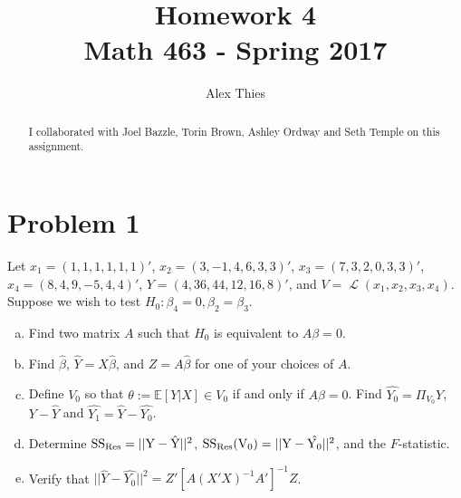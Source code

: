 \documentclass{amsart}\usepackage[]{graphicx}\usepackage[]{color}
\author{Alex Thies}
\title{Homework 4 \\ Math 463 - Spring 2017}
\DeclareMathOperator{\Ell}{\mathscr{L}}
\begin{document}
	\begin{abstract}
		I collaborated with Joel Bazzle, Torin Brown, Ashley Ordway and Seth Temple on this assignment.
	\end{abstract}

	\maketitle


	\section*{Problem 1} %
	\label{sec:problem_1}
		Let $x_{1} =(1,1,1,1,1,1)'$, $x_{2} = (3,−1,4,6,3,3)'$, $x_{3} = (7,3,2,0,3,3)'$, $x_{4} = (8,4,9,−5,4,4)'$, $Y = (4,36,44,12,16,8)'$, and $V = \Ell(x_{1},x_{2},x_{3},x_{4})$.
		Suppose we wish to test $H_{0} : \beta_{4} = 0, \beta_{2} = \beta_{3}$.
		\begin{enumerate}[(a)]
			\item Find two matrix $A$ such that $H_{0}$ is equivalent to $A\beta = 0$.
			\item Find $\hat{\beta}$, $\hat{Y} = X \hat{\beta}$, and $Z = A\hat{\beta}$ for one of your choices of $A$.
			\item Define $V_{0}$ so that $\theta := \mathbb{E}[Y|X] \in V_{0}$ if and only if $A\beta = 0$.
			Find $\hat{Y_{0}} = \Pi_{V_{0}}Y$, $Y - \hat{Y}$ and $\hat{Y_{1}} = \hat{Y} - \hat{Y_{0}}$.
			\item Determine $\rm SS_{Res} = ||Y - \hat{Y}||^{2}$, $\rm SS_{Res}(V_{0}) = ||Y - \hat{Y_{0}}||^{2}$, and the $F$-statistic.
			\item Verify that $||\hat{Y} - \hat{Y_{0}}||^{2} = Z'[A(X'X)^{-1}A']^{-1}Z$.
		\end{enumerate}
\end{document}
